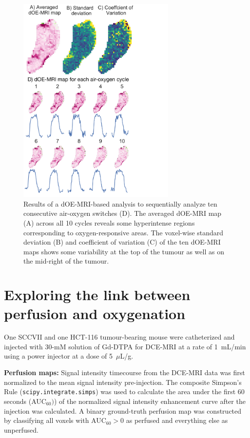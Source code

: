 \begin{figure}[htbp]  
   \centering
   \includegraphics[width=0.7\textwidth]{futurework/futurework-images/cyclingHypoxia.pdf} %
   \caption{Results of a \acs{dOE-MRI}-based analysis to sequentially analyze ten consecutive air-oxygen switches (D). The averaged \acs{dOE-MRI} map (A) across all 10 cycles reveals some hyperintense regions corresponding to oxygen-responsive areas. The voxel-wise standard deviation (B) and coefficient of variation (C) of the ten \acs{dOE-MRI} maps shows some variability at the top of the tumour as well as on the mid-right of the tumour.}
   \label{longcycles}
\end{figure}

\section{Exploring the link between perfusion and oxygenation}

One SCCVII and one HCT-116 tumour-bearing mouse were catheterized and injected with 30-mM solution of Gd-DTPA for \acs{DCE-MRI} at a rate of 1~mL/min using a power injector at a dose of 5~$\mu$L/g.

\noindent\textbf{Perfusion maps:} Signal intensity timecourse from the \acs{DCE-MRI} data was first normalized to the mean signal intensity pre-injection.
The composite Simpson's Rule (\texttt{scipy.integrate.simps}) was used to calculate the area under the first 60 seconds (\acs{AUC}$_{60})$) of the normalized signal intensity enhancement curve after the injection was calculated.
A binary ground-truth perfusion map was constructed by classifying all voxels with AUC$_{60} > 0$ as perfused and everything else as unperfused.

